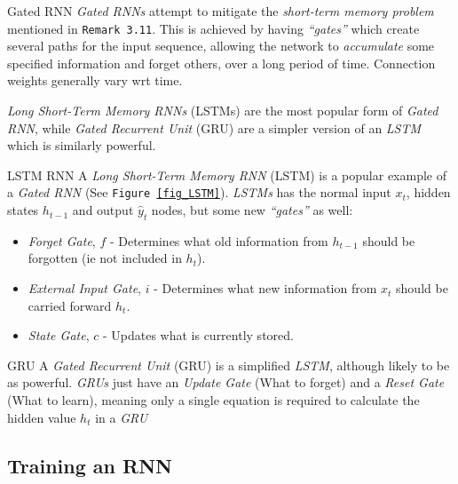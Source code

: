 \documentclass[11pt,a4paper]{article}
\begin{document}
  \begin{definition}{Gated RNN}
    \textit{Gated RNNs} attempt to mitigate the \textit{short-term memory problem} mentioned in \texttt{Remark 3.11}. This is achieved by having \textit{``gates''} which create several paths for the input sequence, allowing the network to \textit{accumulate} some specified information and forget others, over a long period of time. Connection weights generally vary wrt time.
    \par \textit{Long Short-Term Memory RNNs} (LSTMs) are the most popular form of \textit{Gated RNN}, while \textit{Gated Recurrent Unit} (GRU) are a simpler version of an \textit{LSTM} which is similarly powerful.
  \end{definition}

  \begin{proposition}{LSTM RNN}
    A \textit{Long Short-Term Memory RNN} (LSTM) is a popular example of a \textit{Gated RNN} (See \texttt{Figure \ref{fig_LSTM}}). \textit{LSTMs} has the normal input $x_t$, hidden states $h_{t-1}$ and output $\hat{y}_t$ nodes, but some new \textit{``gates''} as well:
    \begin{itemize}
      \item \textit{Forget Gate}, $f$ - Determines what old information from $h_{t-1}$ should be forgotten (ie not included in $h_t$).\footnotemark
      \item \textit{External Input Gate}, $i$ - Determines what new information from $x_t$ should be carried forward $h_t$.\footnotemark[\value{footnote}]
      \item \textit{State Gate}, $c$ - Updates what is currently stored.
    \end{itemize}
  \end{proposition}

  \begin{proposition}{GRU}
    A \textit{Gated Recurrent Unit} (GRU) is a simplified \textit{LSTM}, although likely to be as powerful. \textit{GRUs} just have an \textit{Update Gate} (What to forget) and a \textit{Reset Gate} (What to learn), meaning only a single equation is required to calculate the hidden value $h_t$ in a \textit{GRU}
  \end{proposition}

\subsection*{Training an RNN}
\end{document}
